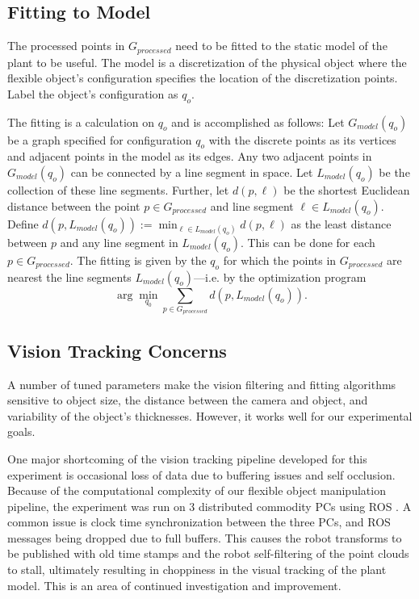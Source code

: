 \documentclass[runningheads,a4paper]{llncs}
\begin{document}
\subsection{Fitting to Model \label{sec-fit}}

The processed points in $G_{processed}$ need to be fitted to the static model of the plant to be useful. The model is a discretization of the physical object where the flexible object's configuration specifies the location of the discretization points. Label the object’s configuration as $q_o$. 

The fitting is a calculation on $q_o$ and is accomplished as follows: Let $G_{model}(q_o)$ be a graph specified for configuration $q_o$ with the discrete points as its vertices and adjacent points in the model as its edges. Any two adjacent points in $G_{model}(q_o)$ can be connected by a line segment in space. Let $L_{model}(q_o)$ be the collection of these line segments. Further, let $d(p,\ell)$ be the shortest Euclidean distance between the point $p\in G_{processed}$ and line segment $\ell \in L_{model}(q_o)$. Define $d(p,L_{model}(q_o)) := \min_{\ell\in L_{model}(q_o)} d(p,\ell)$ as the least distance between $p$ and any line segment in $L_{model}(q_o)$. This can be done for each $p\in G_{processed}$. The fitting is given by the $q_o$ for which the points in $G_{processed}$ are nearest the line segments $L_{model}(q_o)$---i.e. by the optimization program
\begin{equation}
\arg \min_{q_0} \sum_{p\in G_{processed}} d(p,L_{model}(q_o)).
\label{eq-fit_prog}
\end{equation}

\subsection{Vision Tracking Concerns \label{sec-vis_disc}}

A number of tuned parameters make the vision filtering and fitting algorithms sensitive to object size, the distance between the camera and object, and variability of the object's thicknesses. However, it works well for our experimental goals.

One major shortcoming of the vision tracking pipeline developed for this experiment is occasional loss of data due to buffering issues and self occlusion. Because of the computational complexity of our flexible object manipulation pipeline, the experiment was run on 3 distributed commodity PCs using ROS \cite{quigley2009ros}. A common issue is clock time synchronization between the three PCs, and ROS messages being dropped due to full buffers. This causes the robot transforms to be published with old time stamps and the robot self-filtering of the point clouds to stall, ultimately resulting in choppiness in the visual tracking of the plant model. This is an area of continued investigation and improvement. 
\end{document}
